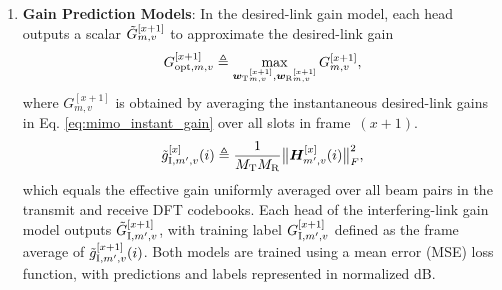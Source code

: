 \documentclass[10pt,journal,letterpaper]{journal_template/IEEEtran}
\newcommand{\rev}[1]{\textcolor{revisioncolor}{{}#1}}
\newif\ifshowdeletions
\newcommand{\currentdel}[1]{\ifshowdeletions\textcolor{deletioncolor}{\sout{#1}}\fi}
\theoremstyle{remark}
\begin{document}
\begin{enumerate}[label=\arabic*.]
    \item \textbf{Gain Prediction Models}: \currentdel{The channel-gain prediction is regarded as a regression task. For each micro BS–vehicle pair-$(m,v)$, we train two separate NN models with identical architecture but independent weights: one for the optimal desired-link gain and one for the interference-link gain.}
    In the desired-link \rev{gain }model, each head outputs a scalar $\Tilde{G}_{m,v}^{[x+1]}$ to approximate the \currentdel{frame-averaged optimal} desired-link gain
    \begin{equation}
        G_{{\rm opt},m,v}^{[x+1]}
        \triangleq
        \max_{{\bm{w}_{\rm T}}_{m,v}^{[x+1]},
              {\bm{w}_{\rm R}}_{m,v}^{[x+1]}} G_{m,v}^{[x+1]},
    \end{equation}
    where $G_{m,v}^{[x+1]}$ is obtained by averaging the instantaneous desired-link gains in Eq. \eqref{eq:mimo_instant_gain} over all slots in frame~$(x\!+\!1)$.
    \currentdel{The interference-link model is similarly defined: its final layer outputs a scalar $\Tilde{G}_{{\rm I},m,v}^{[x+1]}$ with label $G_{{\rm I},m,v}^{[x+1]}$, given by the frame-average of the instantaneous interference-link gains in Eq. \mbox{\eqref{eq:mimo_instant_gain_interference}}.}
    {\color{revisioncolor}
    \begin{equation}
        \label{eq:mimo_average_gain_interference}
        \tilde{g}_{{\rm I},m',v}^{[x]}(i)
        \triangleq \frac{1}{M_{\rm T}M_{\rm R}}
        \bigl\|\boldsymbol H_{m',v}^{[x]}(i)\bigr\|_F^2,
    \end{equation}
    }\rev{which equals the effective gain uniformly averaged over all beam pairs in the transmit and receive DFT codebooks. Each head of the interfering-link gain model outputs $\Tilde{G}_{{\rm I},m',v}^{[x+1]}$, with training label $G_{{\rm I},m',v}^{[x+1]}$ defined as the frame average of $\tilde{g}_{{\rm I},m',v}^{[x+1]}(i)$.}
    Both models are trained using a mean \currentdel{square} error (MSE) loss function, with predictions and labels represented in normalized dB.
\end{enumerate}
\end{document}
